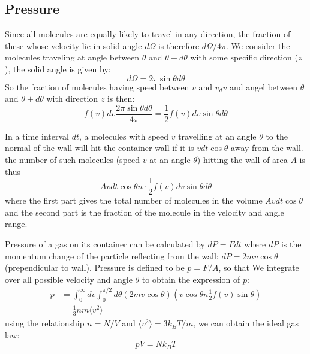 \documentclass{article}
\begin{document}
\subsection{Pressure}
Since all molecules are equally likely to travel in any direction, the fraction of these 
whose velocity lie in solid angle $d\Omega$ is therefore $d\Omega/4\pi$. We consider the 
molecules traveling at angle between $\theta$ and $\theta + d\theta$ with some specific direction ($z$),
the solid angle is given by:
\begin{equation}
    d\Omega = 2\pi \sin\theta d\theta
\end{equation}
So the fraction of molecules having speed between $v$ and $v_dv$ and angel between $\theta$ 
and $\theta + d\theta$ with direction $z$ is then:
\begin{equation}
    f(v) dv \frac{2\pi \sin\theta d\theta}{4\pi} = \frac{1}{2} f(v) dv \sin\theta d\theta 
\end{equation}

In a time interval $dt$, 
a molecules with speed $v$ travelling at an angle $\theta$ to the normal of the wall
will hit the container wall if it is $vdt\cos \theta$ away from the wall. 
the number of such molecules (speed $v$ at an angle $\theta$) 
hitting the wall of area $A$ is thus 
\begin{equation}
    A vdt\cos \theta n \cdot \frac{1}{2} f(v) dv \sin\theta d\theta 
\end{equation}
where the first part gives the total number of molecules in the volume $A vdt\cos \theta$ and 
the second part is the fraction of the molecule in the velocity and angle range.

Pressure of a gas on its container can be calculated by $dP = F dt$ where $dP$ is the momentum 
change of the particle reflecting from the wall: $dP = 2 mv \cos\theta$ (prependicular to wall). 
Pressure is defined to be $p = F/A$, so that 
We integrate over all possible velocity and angle $\theta$ to obtain the expression of $p$:
\begin{align}
    p &= \int_0^{\infty} dv \int_0^{\pi/2} d\theta  ( 2 mv \cos\theta ) 
    \left( v \cos \theta n \frac{1}{2} f(v) \sin\theta \right) \\
    &= \frac{1}{3} n m \langle v^2 \rangle
\end{align}
using the relationship $n = N/V$ and $\langle v^2 \rangle = 3k_BT / m$, we 
can obtain the ideal gas law:
\begin{equation}
    pV = N k_B T
\end{equation}
\end{document}
